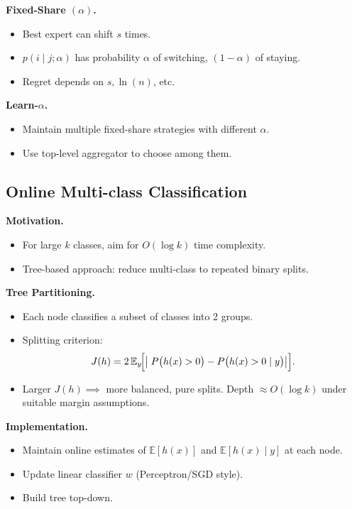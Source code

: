 \documentclass[10pt]{article}
\begin{document}
\begin{multicols}{2}
\textbf{Fixed-Share $(\alpha)$.}
\begin{itemize}
\item Best expert can shift $s$ times.
\item $p(i\mid j;\alpha)$ has probability $\alpha$ of switching, $(1-\alpha)$ of staying.
\item Regret depends on $s,\ln(n)$, etc.
\end{itemize}

\textbf{Learn-$\alpha$.}
\begin{itemize}
\item Maintain multiple fixed-share strategies with different $\alpha$.
\item Use top-level aggregator to choose among them.
\end{itemize}

\subsection*{Online Multi-class Classification}

\textbf{Motivation.}
\begin{itemize}
\item For large $k$ classes, aim for $O(\log k)$ time complexity.
\item Tree-based approach: reduce multi-class to repeated binary splits.
\end{itemize}

\textbf{Tree Partitioning.}
\begin{itemize}
\item Each node classifies a subset of classes into 2 groups.
\item Splitting criterion: 
\[
J(h)=2\,\mathbb{E}_y\!\Bigl[\bigl|\;P\bigl(h(x)>0\bigr)-P\bigl(h(x)>0\mid y\bigr)\bigr|\Bigr].
\]
\item Larger $J(h)\implies$ more balanced, pure splits. Depth $\approx O(\log k)$ under suitable margin assumptions.
\end{itemize}

\textbf{Implementation.}
\begin{itemize}
\item Maintain online estimates of $\mathbb{E}[h(x)]$ and $\mathbb{E}[h(x)\mid y]$ at each node.
\item Update linear classifier $w$ (Perceptron/SGD style).
\item Build tree top-down.
\end{itemize}


\end{multicols}
\end{document}
